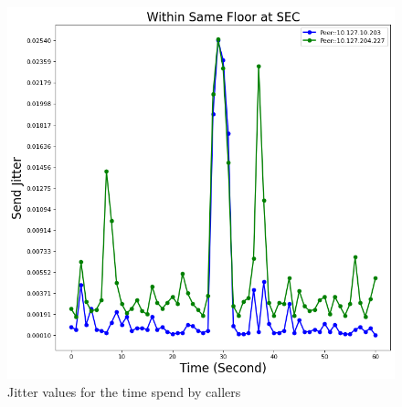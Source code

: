 	\begin{figure}[!t]
		\begin{minipage}{\textwidth}
			\includegraphics[scale=0.38]{Images/experiment/senarios/df_in_floor.png}
		\end{minipage}
		\caption{Jitter values for the time spend by callers}
		\label{fig:scene-out-2}
	\end{figure}

